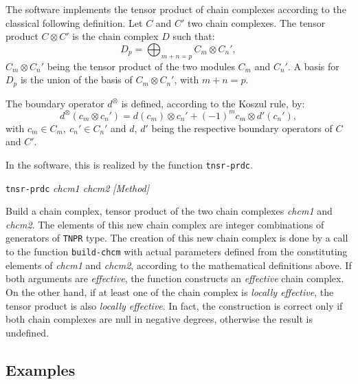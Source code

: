 The software implements the tensor product of chain complexes according to
the classical following definition. Let $C$ and $C'$ two chain complexes. The
tensor product $C\otimes C'$ is the chain complex $D$ such that:
$$ D_p=\bigoplus_{m+n=p}C_m\otimes C_n',$$
$C_m\otimes C_n'$ being the tensor product of the two modules $C_m$ and $C_n'$.
A basis for $D_p$ is the union of the basis of $C_m\otimes C_n'$, with $m+n=p$.
\par
The boundary operator $d^{\otimes}$ is defined, according to the Koszul rule, by:
$$d^{\otimes}(c_m\otimes c_n')=d(c_m)\otimes c_n' +(-1)^m c_m\otimes d'(c_n'),$$
with $c_m\in C_m,\ c_n'\in C_n'$ and $d$, $d'$ being the respective boundary operators
of $C$ and $C'$.
\par
In the software, this is realized by the function {\tt tnsr-prdc}. 
\vskip 0.40cm
{\parindent=0mm
{\leftskip=5mm 
{\tt tnsr-prdc} {\em chcm1 chcm2} \hfill {\em [Method]} \par}
{\leftskip=15mm 
Build a chain complex, tensor product of the two chain complexes {\em chcm1} and {\em chcm2}. The elements
of this new chain complex are integer combinations of generators of {\tt TNPR} type. The creation of this
new chain complex is done
by a call to the function {\tt build-chcm} with actual parameters 
defined from the constituting elements  of {\em chcm1} and {\em chcm2}, according to the
mathematical definitions above. If both arguments are {\em effective}, the function
constructs an {\em effective} chain complex. On the other hand, if at least one of the chain complex 
is {\em locally effective}, the tensor product is also {\em locally effective}. In fact, the construction
is correct only if both chain complexes are null in negative degrees, otherwise the result
is undefined.
\par}}

\subsection* {Examples}

